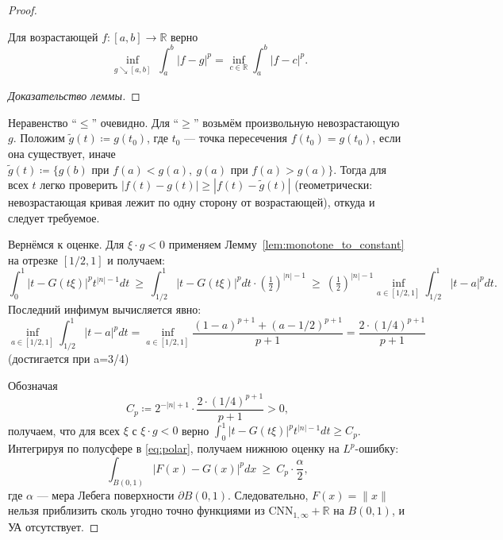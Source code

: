 \documentclass[../NDCNNAI_main.tex]{subfiles}
\begin{document}
\begin{proof}
\begin{lemma}
\label{lem:monotone_to_constant}
Для возрастающей $f\colon[a,b]\to\mathbb{R}$ верно
\[
\inf_{\substack{g \searrow [a,b]}}\int_a^b |f-g|^p
=
\inf_{c \in \mathbb{R}}\int_a^b |f-c|^p.
\]
\end{lemma}
\begin{proof}[Доказательство леммы]
  
\end{proof}
Неравенство ``$\le$'' очевидно.
Для ``$\ge$'' возьмём произвольную невозрастающую $g$.
Положим $\tilde g(t)\coloneq g(t_0)$, где $t_0$ --- точка пересечения $f(t_0)=g(t_0)$, если она существует, иначе $\tilde g(t)\coloneq \{g(b) \text{ при } f(a) < g(a),\ g(a) \text{ при } f(a) > g(a)\}$.
Тогда для всех $t$ легко проверить $|f(t)-g(t)|\ge |f(t)-\tilde g(t)|$ (геометрически: невозрастающая кривая лежит по одну сторону от возрастающей),
откуда и следует требуемое.

Вернёмся к оценке.
Для $\xi\cdot g<0$ применяем Лемму~\ref{lem:monotone_to_constant} на отрезке $[1/2,1]$ и получаем:
\[
\int_0^1 |t-G(t\xi)|^p t^{|n|-1}dt
\ \ge\
\int_{1/2}^1 |t-G(t\xi)|^p dt\cdot \left(\tfrac12\right)^{|n|-1}
\ \ge\
\left(\tfrac12\right)^{|n|-1}\inf_{a\in[1/2,1]}\int_{1/2}^1 |t-a|^p dt.
\]
Последний инфимум вычисляется явно:
\[
\inf_{a\in[1/2,1]}\int_{1/2}^1 |t-a|^p dt
=\inf_{a\in[1/2,1]}\frac{(1-a)^{p+1}+(a-1/2)^{p+1}}{p+1}
=\frac{2\cdot (1/4)^{p+1}}{p+1}
\quad\](достигается при a=3/4)

Обозначая
\[
C_p\coloneq 2^{-|n|+1}\cdot \frac{2\cdot(1/4)^{p+1}}{p+1}>0,
\]
получаем, что для всех $\xi$ с $\xi\cdot g<0$ верно
$\int_0^1 |t-G(t\xi)|^p t^{|n|-1}dt\ge C_p$.
Интегрируя по полусфере в \eqref{eq:polar}, получаем нижнюю оценку на $L^p$-ошибку:
\[
\int_{B(0,1)} |F(x)-G(x)|^p dx \ \ge\ C_p\cdot \frac{\alpha}{2},
\]
где $\alpha$ --- мера Лебега поверхности $\partial B(0,1)$.
Следовательно, $F(x)=\|x\|$ нельзя приблизить сколь угодно точно функциями из $\mathrm{CNN}_{1,\infty}+\mathbb{R}$ на $B(0,1)$,
и УА отсутствует.
\end{proof}
\end{document}
